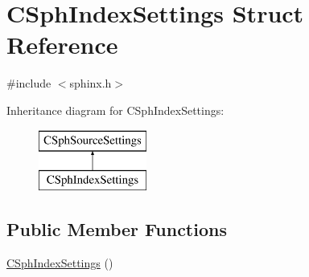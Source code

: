 \hypertarget{structCSphIndexSettings}{\section{C\-Sph\-Index\-Settings Struct Reference}
\label{structCSphIndexSettings}
}


{\ttfamily \#include $<$sphinx.\-h$>$}

Inheritance diagram for C\-Sph\-Index\-Settings\-:\begin{figure}[H]
\begin{center}
\leavevmode
\includegraphics[height=2.000000cm]{structCSphIndexSettings}
\end{center}
\end{figure}
\subsection*{Public Member Functions}
\begin{DoxyCompactItemize}
\item 
\hyperlink{structCSphIndexSettings_a8866949b31ba8a53e50d8fc6bfcc6c68}{C\-Sph\-Index\-Settings} ()
\end{DoxyCompactItemize}
